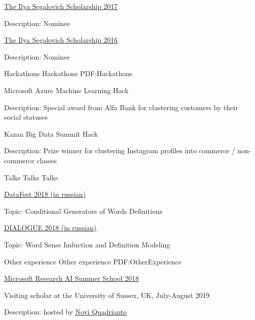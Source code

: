 \documentclass[letterpaper,MMMyyyy,nonstopmode]{simpleresumecv}
\begin{document}
\begin{Body}
\BulletItem
\href{https://yandex.com/scholarships/students}{The Ilya Segalovich Scholarship 2017}
\begin{Detail}
\Item
Description: Nominee
\end{Detail}

\BulletItem
\href{https://yandex.com/scholarships/students}{The Ilya Segalovich Scholarship 2016}
\begin{Detail}
\Item
Description: Nominee
\end{Detail}



\Section
{Hackathons}
{Hackathons}
{PDF:Hackathons}

\BulletItem
Microsoft Azure Machine Learning Hack
\begin{Detail}
\Item
Description: Special award from Alfa Bank for clustering customers by their social statuses
\end{Detail}

\Gap

\BulletItem
Kazan Big Data Summit Hack
\begin{Detail}
\Item
Description: Prize winner for clustering Instagram profiles into commerce / non-commerce classes
\end{Detail}



\Section
{Talks}
{Talks}
{Talks}

\Item
\href{http://datafest.ru}{DataFest 2018 (in russian)}
\begin{Detail}
\Item
Topic: Conditional Generators of Words Definitions
\end{Detail}

\Gap
\Item
\href{http://www.dialog-21.ru/en/}{DIALOGUE 2018 (in russian)}
\begin{Detail}
\Item
Topic: Word Sense Induction and Definition Modeling
\end{Detail}



\Section
{Other experience}
{Other experience}
{PDF:OtherExperience}

\Gap
\BulletItem
\href{https://www.microsoft.com/en-us/research/event/ai-summer-school-2018/}{Microsoft Research AI Summer School 2018}

\BulletItem Visiting scholar at the University of Sussex, UK, July-August 2019
\begin{Detail}
\Item
Description: hosted by \href{http://www.sussex.ac.uk/profiles/335583}{Novi Quadrianto}
\end{Detail}


\end{Body}
\end{document}
